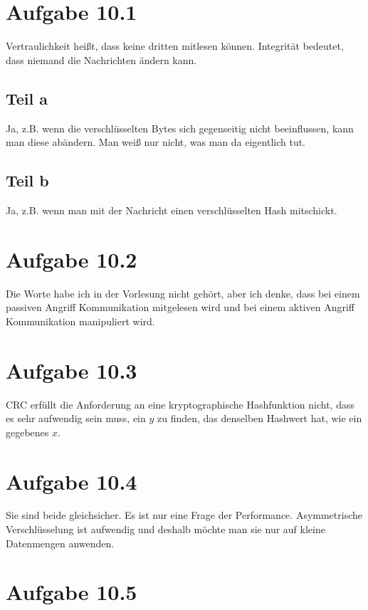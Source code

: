 \documentclass[10pt,a4paper]{article}
\begin{document}
\section{Aufgabe 10.1}

Vertraulichkeit heißt, dass keine dritten mitlesen können. Integrität bedeutet,
dass niemand die Nachrichten ändern kann.

\subsection{Teil a}

Ja, z.B. wenn die verschlüsselten Bytes sich gegenseitig nicht beeinflussen,
kann man diese abändern. Man weiß nur nicht, was man da eigentlich tut.

\subsection{Teil b}

Ja, z.B. wenn man mit der Nachricht einen verschlüsselten Hash mitschickt.

\section{Aufgabe 10.2}

Die Worte habe ich in der Vorlesung nicht gehört, aber ich denke, dass bei einem
passiven Angriff Kommunikation mitgelesen wird und bei einem aktiven Angriff
Kommunikation manipuliert wird.

\section{Aufgabe 10.3}

CRC erfüllt die Anforderung an eine kryptographische Hashfunktion nicht, dass es
sehr aufwendig sein muss, ein $y$ zu finden, das denselben Hashwert hat, wie ein
gegebenes $x$.

\section{Aufgabe 10.4}

Sie sind beide gleichsicher. Es ist nur eine Frage der
Performance. Asymmetrische Verschlüsselung ist aufwendig und deshalb möchte man
sie nur auf kleine Datenmengen anwenden.

\section{Aufgabe 10.5}
\end{document}
